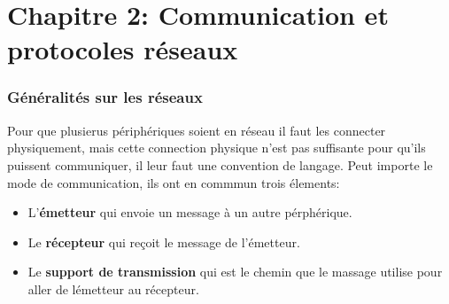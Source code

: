  \part{Chapitre 2: Communication et protocoles réseaux}
 \section{Généralités sur les réseaux}
 Pour que plusierus périphériques soient en réseau il faut les connecter physiquement, mais cette connection physique n'est pas suffisante pour qu'ils puissent communiquer, il leur faut une convention de langage. Peut importe le mode de communication, ils ont en commmun trois élements:
 \begin{itemize}
	 \item L'\textbf{émetteur} qui envoie un message à un autre pérphérique.
	 \item Le \textbf{récepteur} qui reçoit le message de l'émetteur.
	 \item Le \textbf{support de transmission} qui est le chemin que le massage utilise pour aller de lémetteur au récepteur.
 \end{itemize}
